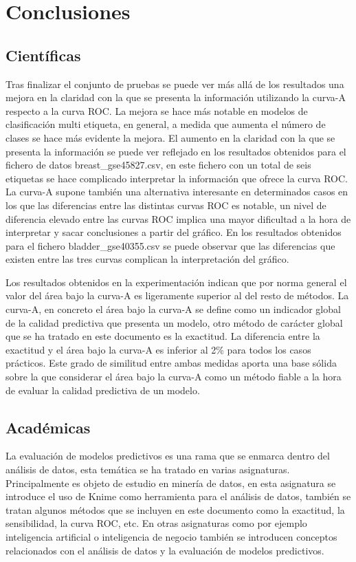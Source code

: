 \section{Conclusiones}

\subsection{Científicas}

Tras finalizar el conjunto de pruebas se puede ver más allá de los resultados una mejora en la claridad con la que se presenta la información utilizando la curva-A respecto a la curva ROC. La mejora se hace más notable en modelos de clasificación multi etiqueta, en general, a medida que aumenta el número de clases se hace más evidente la mejora. El aumento en la claridad con la que se presenta la información se puede ver reflejado en los resultados obtenidos para el fichero de datos breast\_gse45827.csv, en este fichero con un total de seis etiquetas se hace complicado interpretar la información que ofrece la curva ROC. La curva-A supone también una alternativa interesante en determinados casos en los que las diferencias entre las distintas curvas ROC es notable, un nivel de diferencia elevado entre las curvas ROC implica una mayor dificultad a la hora de interpretar y sacar conclusiones a partir del gráfico. En los resultados obtenidos para el fichero bladder\_gse40355.csv se puede observar que las diferencias que existen entre las tres curvas complican la interpretación del gráfico.

\bigbreak

Los resultados obtenidos en la experimentación indican que por norma general el valor del área bajo la curva-A es ligeramente superior al del resto de métodos. La curva-A, en concreto el área bajo la curva-A se define como un indicador global de la calidad predictiva que presenta un modelo, otro método de carácter global que se ha tratado en este documento es la exactitud. La diferencia entre la exactitud y el área bajo la curva-A es inferior al 2\% para todos los casos prácticos. Este grado de similitud entre ambas medidas aporta una base sólida sobre la que considerar el área bajo la curva-A como un método fiable a la hora de evaluar la calidad predictiva de un modelo.

\subsection{Académicas}

La evaluación de modelos predictivos es una rama que se enmarca dentro del análisis de datos, esta temática se ha tratado en varias asignaturas. Principalmente es objeto de estudio en minería de datos, en esta asignatura se introduce el uso de Knime como herramienta para el análisis de datos, también se tratan algunos métodos que se incluyen en este documento como la exactitud, la sensibilidad, la curva ROC, etc. En otras asignaturas como por ejemplo inteligencia artificial o inteligencia de negocio también se introducen conceptos relacionados con el análisis de datos y la evaluación de modelos predictivos.


